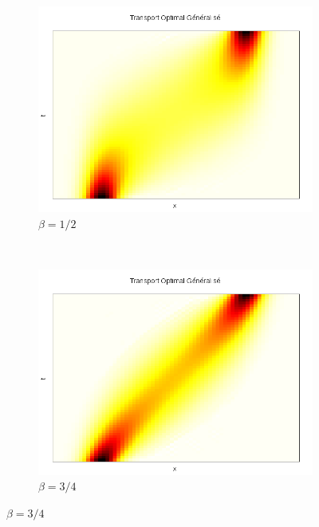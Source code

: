 \documentclass[a4paper,12pt]{article}
\begin{document}
\begin{figure}[!h]
	\begin{subfigure}[b]{0.48\linewidth}
	\includegraphics[width=\textwidth]{img/1DGeneralise/transport50.png}
	\caption{$\beta = 1/2$}
	\end{subfigure}
	~
	\begin{subfigure}[b]{0.48\linewidth}
	\includegraphics[width=\textwidth]{img/1DGeneralise/transport75.png}
	\caption{$\beta = 3/4$}
	\end{subfigure}	
	

\end{figure}
\end{document}
